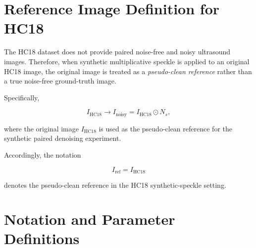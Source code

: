 \documentclass[conference]{IEEEtran}
\begin{document}

\section{Reference Image Definition for HC18}

The HC18 dataset does not provide paired noise-free and noisy
ultrasound images. Therefore, when synthetic multiplicative speckle
is applied to an original HC18 image, the original image is treated
as a \textit{pseudo-clean reference} rather than a true noise-free
ground-truth image.

Specifically,

\begin{equation}
I_{\mathrm{HC18}}
\rightarrow
I_{\mathrm{noisy}}
=
I_{\mathrm{HC18}}
\odot N_s,
\end{equation}

where the original image $I_{\mathrm{HC18}}$ is used as the
pseudo-clean reference for the synthetic paired denoising experiment.

Accordingly, the notation

\begin{equation}
I_{\mathrm{ref}}
=
I_{\mathrm{HC18}}
\end{equation}

denotes the pseudo-clean reference in the HC18 synthetic-speckle
setting.



\section{Notation and Parameter Definitions}
\end{document}

